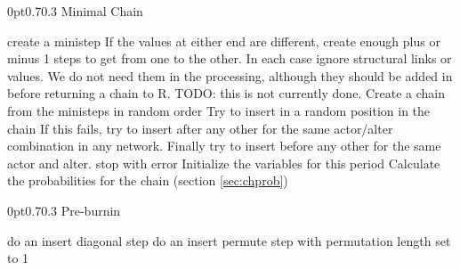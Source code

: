 \documentclass[12pt,a4paper]{article}
\makeatletter
\renewcommand{\=}{\,=\,}
\newcommand{\+}{\,+\,}
\newcommand{\Rn}{{\sf R}}
\renewcommand{\subsection}{\@startsection{subsection}{2}
                {0pt}{0.7\baselineskip}{0.3\baselineskip}
                {\sffamily} }
\makeatother
\begin{document}
\subsection{Minimal Chain}
\label{sec:minch}
  \begin{algorithmic}
\STATE create a ministep
\ENDFOR
\ELSE[behavior]
\STATE If the values at either end are different, create enough plus or minus 1
steps to get from one to the other.
\ENDIF
\ENDFOR
\ENDFOR
\STATE In each case ignore structural links or values. We do not need them in
the processing, although they should be added in before returning a chain to
\Rn. TODO: this is not currently done.
\STATE Create a chain from the ministeps in random order
\ELSE
\REPEAT
{}
\STATE Try to insert in a random position in the chain
\STATE If this fails, try to insert after any other for the same
actor/alter combination in any network.
\STATE Finally try to insert before any other for the same actor and alter.
\ENDFOR
{}
\STATE stop with error
\ENDIF
\ENDIF
\STATE Initialize the variables for this period
\STATE Calculate the probabilities for the chain (section \ref{sec:chprob})
\ENDFOR
  \end{algorithmic}
 \subsection{Pre-burnin}
\label{sec:preburnin}
  \begin{algorithmic}
\REPEAT
\STATE do an insert diagonal step
\REPEAT
\STATE do an insert permute step with permutation length set to 1
  \end{algorithmic}
\end{document}
